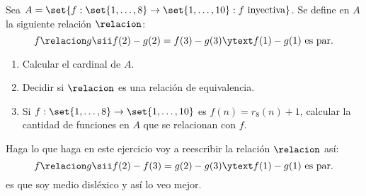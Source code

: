 \begin{enunciado}{\ejExtra}
	Sea $A = \set{f : \set{1, \ldots, 8} \to \set{1,\ldots, 10} : f \text{ inyectiva}}$. Se define en $A$ la siguiente
	relación $\relacion$:
	$$
		f \relacion g \sii f(2) - g(2) = f(3) - g(3) \ytext f(1) - g(1) \text{ es par}.
	$$
	\begin{enumerate}[label=(\alph*)]
		\item Calcular el cardinal de $A$.
		\item Decidir si $\relacion$ es una relación de equivalencia.
		\item Si $f : \set{1,\ldots, 8} \to \set{1, \ldots, 10}$ es $f(n) = r_8(n) + 1$, calcular la cantidad de funciones en $A$
		      que se relacionan con $f$.
	\end{enumerate}
\end{enunciado}
Haga lo que haga en este ejercicio voy a reescribir la relación $\relacion$ así:
$$
	f \relacion g \sii f(2) - f(3) = g(2) - g(3) \ytext f(1) - g(1) \text{ es par}.
$$
es que soy medio disléxico y así lo veo mejor.

